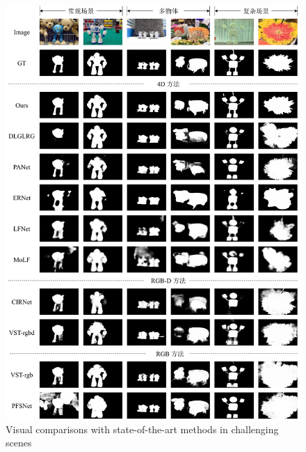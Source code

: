 \begin{figure}[p]
	\centering
	\includegraphics[width=\linewidth]{figures/chapter3/compare_with_sota}
	{Visual comparisons with state-of-the-art methods in challenging scenes}
	\label{figure:figure_comparison_1}
\end{figure}
%
%
